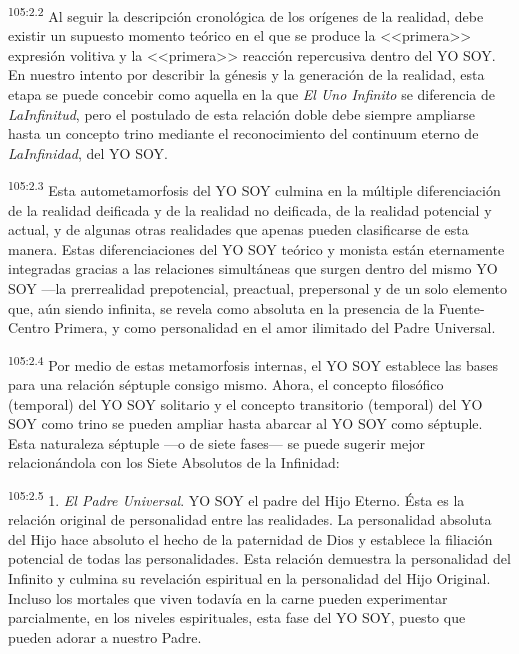 \par
\textsuperscript{105:2.2} Al seguir la descripción cronológica de los orígenes de la realidad, debe existir un supuesto momento teórico en el que se produce la <<primera>> expresión volitiva y la <<primera>> reacción repercusiva dentro del YO SOY. En nuestro intento por describir la génesis y la generación de la realidad, esta etapa se puede concebir como aquella en la que \textit{El Uno Infinito} se diferencia de \textit{LaInfinitud}, pero el postulado de esta relación doble debe siempre ampliarse hasta un concepto trino mediante el reconocimiento del continuum eterno de \textit{LaInfinidad}, del YO SOY.

\par
\textsuperscript{105:2.3} Esta autometamorfosis del YO SOY culmina en la múltiple diferenciación de la realidad deificada y de la realidad no deificada, de la realidad potencial y actual, y de algunas otras realidades que apenas pueden clasificarse de esta manera. Estas diferenciaciones del YO SOY teórico y monista están eternamente integradas gracias a las relaciones simultáneas que surgen dentro del mismo YO SOY ---la prerrealidad prepotencial, preactual, prepersonal y de un solo elemento que, aún siendo infinita, se revela como absoluta en la presencia de la Fuente-Centro Primera, y como personalidad en el amor ilimitado del Padre Universal.

\par
\textsuperscript{105:2.4} Por medio de estas metamorfosis internas, el YO SOY establece las bases para una relación séptuple consigo mismo. Ahora, el concepto filosófico (temporal) del YO SOY solitario y el concepto transitorio (temporal) del YO SOY como trino se pueden ampliar hasta abarcar al YO SOY como séptuple. Esta naturaleza séptuple ---o de siete fases--- se puede sugerir mejor relacionándola con los Siete Absolutos de la Infinidad:

\par
\textsuperscript{105:2.5} 1. \textit{El Padre Universal}. YO SOY el padre del Hijo Eterno. Ésta es la relación original de personalidad entre las realidades. La personalidad absoluta del Hijo hace absoluto el hecho de la paternidad de Dios y establece la filiación potencial de todas las personalidades. Esta relación demuestra la personalidad del Infinito y culmina su revelación espiritual en la personalidad del Hijo Original. Incluso los mortales que viven todavía en la carne pueden experimentar parcialmente, en los niveles espirituales, esta fase del YO SOY, puesto que pueden adorar a nuestro Padre.

